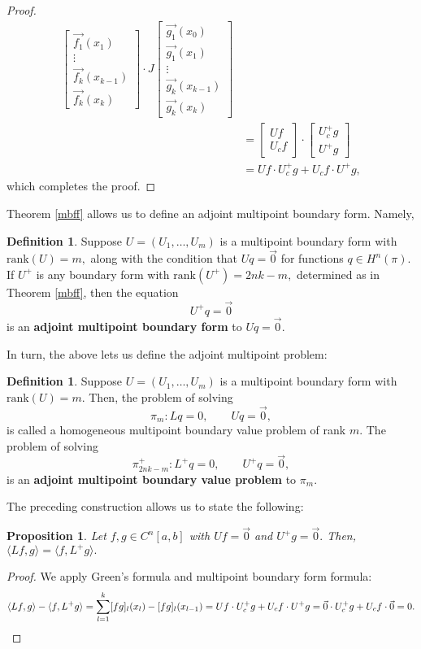 \documentclass[11pt,reqno,oneside,a4paper]{article}
\theoremstyle{plain} %
\newtheorem{proposition}{Proposition}
\theoremstyle{definition}
\newtheorem{definition}[theorem]{Definition}
\theoremstyle{remark}
\begin{document}
\begin{proof}
\begin{align*}
\begin{bmatrix}
\vec{f_1}(x_1) \\
\vdots \\
\vec{f_k}(x_{k-1})  \\
\vec{f_k}(x_k)
\end{bmatrix} \cdot 
J\begin{bmatrix}
\vec{g_1}(x_{0})  \\
\vec{g_1}(x_1) \\
\vdots \\
\vec{g_k}(x_{k-1})  \\
\vec{g_k}(x_k)
\end{bmatrix} \\
&= \begin{bmatrix}
Uf \\
U_c f
\end{bmatrix} \cdot 
\begin{bmatrix}
U^+_cg \\
U^+ g
\end{bmatrix} \\
&=  Uf\cdot U^+_c g + U_c f \cdot U^+ g,
\end{align*}
which completes the proof.
\end{proof}
Theorem \ref{mbff} allows us to define an adjoint multipoint boundary form. Namely, 
\newline
\begin{definition}
Suppose $U = (U_1, \ldots, U_m)$ is a multipoint boundary form with $\mathrm{rank}(U) = m,$ along with the condition that $Uq = \vec{0}$ for functions $q \in H^n(\pi).$ If $U^+$ is any boundary form with  $\mathrm{rank}(U^+) = 2nk-m,$ determined as in Theorem \ref{mbff}, then the equation 
\[ 
U^+q = \vec{0}
\]
is an \textbf{adjoint multipoint boundary form} to $Uq = \vec{0}.$
\end{definition}

In turn, the above lets us define the adjoint multipoint problem:
\newline
\begin{definition}
Suppose $U = (U_1, \ldots, U_m)$ is a multipoint boundary form with $\mathrm{rank}(U) = m.$ Then, the problem of solving 
\[ \pi_m: Lq = 0, \qquad Uq = \vec{0},\] 
is called a homogeneous multipoint boundary value problem of rank $m.$ The problem of solving 
\[ \pi_{2nk-m}^+: L^+q = 0, \qquad U^+q = \vec{0},\] 
is an \textbf{adjoint multipoint boundary value problem} to $\pi_m.$
\end{definition}

The preceding construction allows us to state the following:
\newline
\begin{proposition}
Let $f,g \in C^n[a,b]$ with $Uf = \vec{0}$ and $U^+g = \vec{0}.$ Then, $\langle Lf, g\rangle = \langle f, L^+g\rangle.$
\end{proposition}
\begin{proof}
We apply Green's formula and multipoint boundary form formula:
\[ \langle Lf, g\rangle - \langle f, L^+g\rangle = \sum^k_{l=1}  [fg]_l(x_l) - [fg]_l(x_{l-1}) = Uf\cdot U^+_c g + U_c f \cdot U^+ g = \vec{0}\cdot U^+_c g + U_c f \cdot \vec{0} = 0. \qedhere\]
\end{proof}
\end{document}

